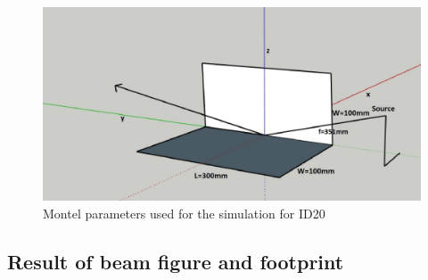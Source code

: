 \begin{figure}[H]
%
\centering
%
\includegraphics[width=1.\textwidth]{Immagini/Chapter4/ID20System}
%
\caption{Montel parameters used for the simulation for ID20}
%
\label{fig: ID20System}
%
\end{figure}

\subsection{Result of beam figure and footprint}

